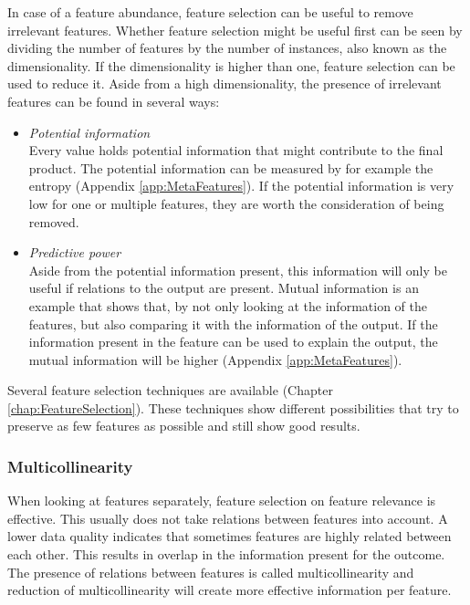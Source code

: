 \documentclass[10pt,a4paper]{report}
\begin{document}
	In case of a feature abundance, feature selection can be useful to remove irrelevant features. Whether feature selection might be useful first can be seen by dividing the number of features by the number of instances, also known as the dimensionality. If the dimensionality is higher than one, feature selection can be used to reduce it. Aside from a high dimensionality, the presence of irrelevant features can be found in several ways:
	
	\begin{itemize}
		\item \textit{Potential information} \\ 
		Every value holds potential information that might contribute to the final product. The potential information can be measured by for example the entropy\cite{agresti2003categorical} (Appendix \ref{app:MetaFeatures}). If the potential information is very low for one or multiple features, they are worth the consideration of being removed.
		\item \textit{Predictive power} \\ 
		Aside from the potential information present, this information will only be useful if relations to the output are present. Mutual information is an example that shows that, by not only looking at the information of the features, but also comparing it with the information of the output. If the information present in the feature can be used to explain the output, the mutual information will be higher\cite{peng2005feature} (Appendix \ref{app:MetaFeatures}).
	\end{itemize}
	
	Several feature selection techniques are available (Chapter \ref{chap:FeatureSelection}). These techniques show different possibilities that try to preserve as few features as possible and still show good results.
	
	\subsubsection{Multicollinearity}
	
	When looking at features separately, feature selection on feature relevance is effective. This usually does not take relations between features into account. A lower data quality indicates that sometimes features are highly related between each other. This results in overlap in the information present for the outcome. The presence of relations between features is called multicollinearity and reduction of multicollinearity will create more effective information per feature.
	
\end{document}
